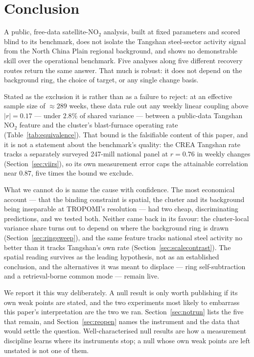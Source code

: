 \documentclass[11pt,a4paper]{article}
\newcommand{\rval}[1]{\mbox{$r=#1$}}
\providecommand{\ce}[1]{\ensuremath{\mathrm{#1}}}
\begin{document}
\section{Conclusion}
\label{sec:conclusion}

A public, free-data satellite-\ce{NO_2} analysis, built at fixed parameters and scored blind to
its benchmark, does not isolate the Tangshan steel-sector activity signal from the North China
Plain regional background, and shows no demonstrable skill over the operational benchmark. Five
analyses along five different recovery routes return the same answer. That much is robust: it does
not depend on the background ring, the choice of target, or any single change basis.

Stated as the exclusion it is rather than as a failure to reject: at an effective sample size of
$\approx289$ weeks, these data rule out any weekly linear coupling above $|r|=0.17$ --- under
$2.8\%$ of shared variance --- between a public-data Tangshan \ce{NO_2} feature and the
cluster's blast-furnace operating rate (Table~\ref{tab:equivalence}). That bound is the falsifiable
content of this paper, and it is not a statement about the benchmark's quality: the CREA Tangshan
rate tracks a separately surveyed 247-mill national panel at \rval{0.76} in weekly changes
(Section~\ref{sec:viirs}), so its own measurement error caps the attainable correlation near
$0.87$, five times the bound we exclude.

What we cannot do is name the cause with confidence. The most economical account --- that the
binding constraint is spatial, the cluster and its background being inseparable at TROPOMI's
resolution --- had two cheap, discriminating predictions, and we tested both. Neither came back in
its favour: the cluster-local variance share turns out to depend on where the background ring is
drawn (Section~\ref{sec:ringsweep}), and the same feature tracks national steel activity no better
than it tracks Tangshan's own rate (Section~\ref{sec:scalecontrast}). The spatial reading survives
as the leading hypothesis, not as an established conclusion, and the alternatives it was meant to
displace --- ring self-subtraction and a retrieval-borne common mode --- remain live.

We report it this way deliberately. A null result is only worth publishing if its own weak points
are stated, and the two experiments most likely to embarrass this paper's interpretation are the
two we ran. Section~\ref{sec:notrun} lists the five that remain, and Section~\ref{sec:reopen} names
the instrument and the data that would settle the question. Well-characterised null results are how
a measurement discipline learns where its instruments stop; a null whose own weak points are left
unstated is not one of them.
\end{document}
